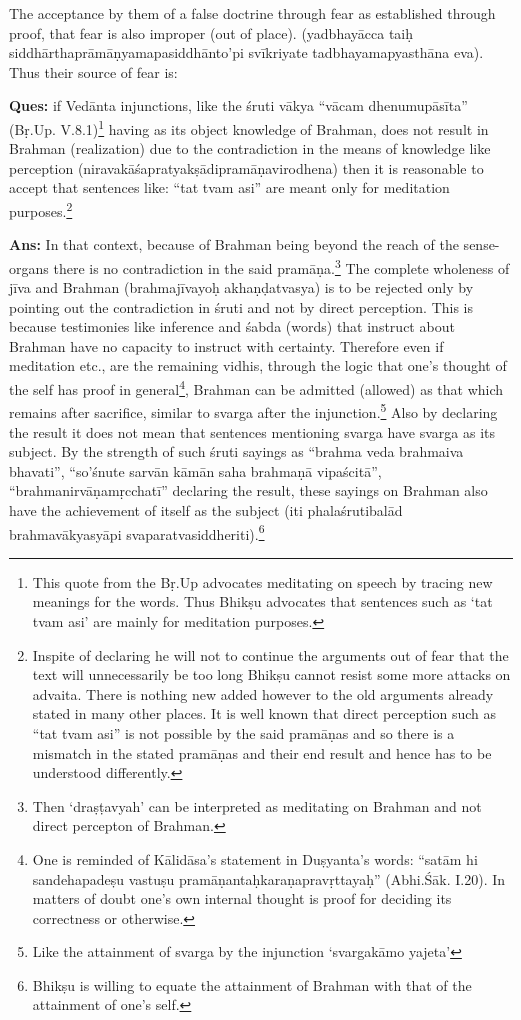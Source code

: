 \vskip 3pt

The acceptance by them of a false doctrine through fear as established through proof, that fear is also improper (out of place). (yadbhayācca taiḥ siddhārthaprāmāṇyamapasiddhānto’pi svīkriyate tadbhayamapyasthāna eva). Thus their source of fear is: 

\vskip 3pt

\textbf{Ques:} if Vedānta injunctions, like the śruti vākya “vācam dhenumupā\-sīta” (Bṛ.Up. V.8.1)\footnote{This quote from the Bṛ.Up advocates meditating on speech by tracing new meanings for the words. Thus Bhikṣu advocates that sentences such as ‘tat tvam asi’ are mainly for meditation purposes.}  having as its object knowledge of Brahman, does not result in Brahman (realization) due to the contradiction in the means of knowledge like perception (niravakāśapratyakṣādipramāṇa\-virodhena) then it is reasonable to accept that sentences like: “tat tvam asi” are meant only for meditation purposes.\footnote{Inspite of declaring he will not to continue the arguments out of fear that the text will unnecessarily be too long Bhikṣu cannot resist some more attacks on advaita. There is nothing new added however to the old arguments already stated in many other places. It is well known that direct perception such as “tat tvam asi” is not possible by the said pramāṇas and so there is a mismatch in the stated pramāṇas and their end result and hence has to be understood differently.} 

\textbf{Ans:} In that context, because of Brahman being beyond the reach of the sense-organs there is no contradiction in the said pramāṇa.\footnote{Then ‘draṣṭavyah’ can be interpreted as meditating on Brahman and not direct percepton of Brahman.} The complete wholeness of jīva and Brahman (brahmajīvayoḥ akhaṇḍatvasya) is to be rejected only by pointing out the contradiction in śruti and not by direct perception. This is because testimonies like inference and śabda (words) that instruct about Brahman have no capacity to instruct with certainty. Therefore even if meditation etc., are the remaining vidhis, through the logic that one’s thought of the self has proof in general\footnote{One is reminded of Kālidāsa’s statement in Duṣyanta’s words: “satām hi sandehapadeṣu vastuṣu pramāṇantaḥkaraṇapravṛttayaḥ” (Abhi.Śāk. I.20). In matters of doubt one’s own internal thought is proof for deciding its correctness or otherwise.}, Brahman can be admitted (allowed) as that which remains after sacrifice, similar to svarga after the injunction.\footnote{Like the attainment of svarga by the injunction ‘svargakāmo yajeta’} Also by declaring the result it does not mean that sentences mentioning svarga have svarga as its subject. By the strength of such śruti sayings as “brahma veda brahmaiva bhavati”, “so’śnute sarvān kāmān saha brahmaṇā vipaścitā”, “brahmanirvāṇamṛcchatī” declaring the result, these sayings on Brahman also have the achievement of itself as the subject (iti phalaśrutibalād brahmavākyasyāpi svaparatvasiddheriti).\footnote{Bhikṣu is willing to equate the attainment of Brahman with that of the attainment of one’s self.}

